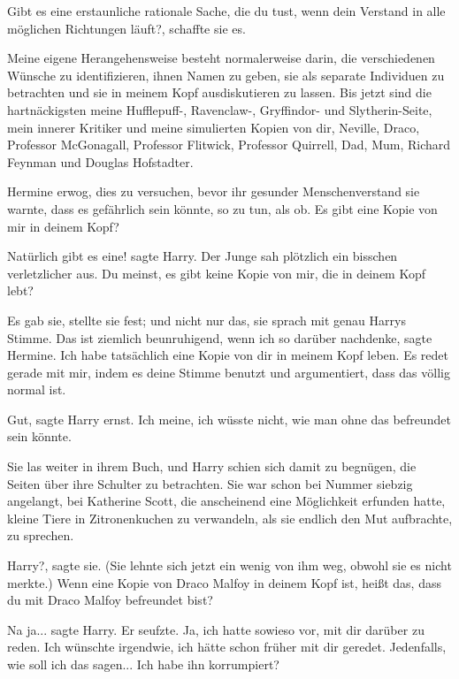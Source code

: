 \glqq Gibt es eine erstaunliche rationale Sache, die du tust, wenn dein Verstand
in alle möglichen Richtungen läuft?\grqq{}, schaffte sie es.

\glqq Meine eigene Herangehensweise besteht normalerweise darin, die
verschiedenen Wünsche zu identifizieren, ihnen Namen zu geben, sie als separate
Individuen zu betrachten und sie in meinem Kopf ausdiskutieren zu lassen. Bis
jetzt sind die hartnäckigsten meine Hufflepuff-, Ravenclaw-, Gryffindor- und
Slytherin-Seite, mein innerer Kritiker und meine simulierten Kopien von dir,
Neville, Draco, Professor McGonagall, Professor Flitwick, Professor Quirrell,
Dad, Mum, Richard Feynman und Douglas Hofstadter.\grqq{}

Hermine erwog, dies zu versuchen, bevor ihr gesunder Menschenverstand sie
warnte, dass es gefährlich sein könnte, so zu tun, als ob. \glqq Es gibt eine
Kopie von mir in deinem Kopf?\grqq{}

\glqq Natürlich gibt es eine!\grqq{} sagte Harry. Der Junge sah plötzlich ein
bisschen verletzlicher aus. \glqq Du meinst, es gibt keine Kopie von mir, die in
deinem Kopf lebt?\grqq{}

Es gab sie, stellte sie fest; und nicht nur das, sie sprach mit genau Harrys
Stimme. \glqq Das ist ziemlich beunruhigend, wenn ich so darüber
nachdenke\grqq{}, sagte Hermine. \glqq Ich habe tatsächlich eine Kopie von dir
in meinem Kopf leben. Es redet gerade mit mir, indem es deine Stimme benutzt und
argumentiert, dass das völlig normal ist.\grqq{}

\glqq Gut\grqq{}, sagte Harry ernst. \glqq Ich meine, ich wüsste nicht, wie man
ohne das befreundet sein könnte.\grqq{}

Sie las weiter in ihrem Buch, und Harry schien sich damit zu begnügen, die
Seiten über ihre Schulter zu betrachten. Sie war schon bei Nummer siebzig
angelangt, bei Katherine Scott, die anscheinend eine Möglichkeit erfunden hatte,
kleine Tiere in Zitronenkuchen zu verwandeln, als sie endlich den Mut
aufbrachte, zu sprechen.

\glqq Harry?\grqq{}, sagte sie. (Sie lehnte sich jetzt ein wenig von ihm weg,
obwohl sie es nicht merkte.) \glqq Wenn eine Kopie von Draco Malfoy in deinem
Kopf ist, heißt das, dass du mit Draco Malfoy befreundet bist?\grqq{}

\glqq Na ja...\grqq{} sagte Harry. Er seufzte. \glqq Ja, ich hatte sowieso vor,
mit dir darüber zu reden. Ich wünschte irgendwie, ich hätte schon früher mit dir
geredet. Jedenfalls, wie soll ich das sagen... Ich habe ihn korrumpiert?\grqq{}

